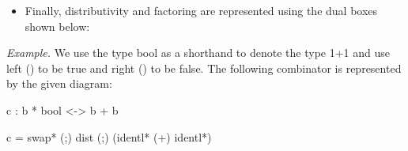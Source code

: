 \documentclass[preprint]{sigplanconf}
\begin{document}
\begin{itemize}
\item Finally, distributivity and factoring are represented using the dual
  boxes shown below:
\begin{multicols}{2}
\begin{center}
\end{center}
\begin{center}
\end{center}
\end{multicols}

\end{itemize}

\noindent 
\textit{Example.}  We use the type {{bool}} as a shorthand to denote
the type {{1+1}} and use {{left ()}} to be {{true}} and {{right ()}}
to be {{false}}. The following combinator is represented by the given
diagram:

{{c : b * bool <-> b + b}}

{{c = swap* (;) dist (;) (identl* (+) identl*)}}

\begin{center}
\end{center}
\end{document}
